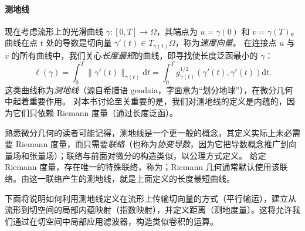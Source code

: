 


\paragraph{测地线}

现在考虑流形上的光滑曲线 $\gamma : [0,T] \rightarrow \Omega$，其端点为 $u = \gamma(0)$ 和 $v = \gamma(T)$。曲线在点 $t$ 处的导数是切向量 $\gamma'(t) \in T_{\gamma(t)}\Omega$，称为{\em 速度向量}。
%
在连接点 $u$ 与 $v$ 的所有曲线中，我们关心{\em 长度最短}的曲线，即寻找使长度泛函最小的 $\gamma$：
%
$$
\ell(\gamma) = \int_{0}^T \| \gamma'(t) \|_{\gamma(t)} \mathrm{d}t =  \int_{0}^T g_{\gamma(t)}^{1/2} (\gamma'(t), \gamma'(t)) \mathrm{d}t. 
$$
%
这类曲线称为{\em 测地线}（源自希腊语 \textgreek{geodaia}，字面意为“划分地球”），在微分几何中起着重要作用。
%
%
对本书讨论至关重要的是，我们对测地线的定义是内蕴的，因为它们只依赖 Riemann 度量（通过长度泛函）。


熟悉微分几何的读者可能记得，测地线是一个更一般的概念，其定义实际上未必需要 Riemann 度量，而只需要{\em 联络}（也称为{\em 协变导数}，因为它把导数概念推广到向量场和张量场）；联络与前面对微分的构造类似，以公理方式定义。
%
给定 Riemann 度量，存在唯一的特殊联络，称为；Riemann 几何通常默认使用该联络。由这一联络产生的测地线，就是上面定义的长度最短曲线。


下面将说明如何利用测地线定义在流形上传输切向量的方式（平行输运），建立从流形到切空间的局部内蕴映射（指数映射），并定义距离（测地度量）。这将允许我们通过在切空间中局部应用滤波器，构造类似卷积的运算。%



